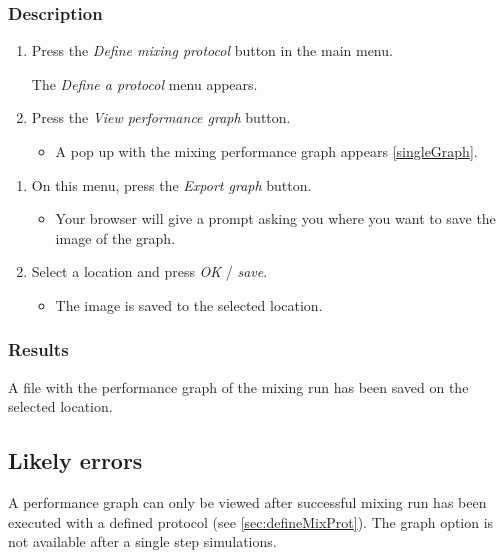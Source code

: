 \subsubsection{Description}
\begin{enumerate}
	\item  Press the \emph{Define mixing protocol} button in the main menu. 
		\begin{itemize}
            The \emph{Define a protocol} menu appears.
		\end{itemize}
	\item Press the \emph{View performance graph} button.
		\begin{itemize}
            \item A pop up with the mixing performance graph appears \ref{singleGraph}.
		\end{itemize}
\end{enumerate}
\begin{enumerate}

    \item On this menu, press the \emph{Export graph} button.
		\begin{itemize}
             \item Your browser will give a prompt asking you where you want to save the image of the graph.
		\end{itemize}
    \item  Select a location and press \emph{OK} / \emph{save}.
		\begin{itemize}
           \item The image is saved to the selected location.
		\end{itemize}
\end{enumerate}

\subsubsection{Results}
A file with the performance graph of the mixing run has been saved on the selected location.

\subsection{Likely errors}
A performance graph can only be viewed after successful mixing run has been executed with a defined protocol (see \ref{sec:defineMixProt}). The graph option is not available after a single step simulations.

